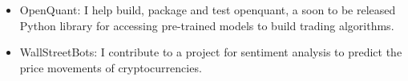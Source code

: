 \documentclass[10pt,a4paper,ragged2e]{altacv}
\begin{document}

\begin{fullwidth}
\makecvheader
\end{fullwidth}



\begin{itemize}
\item OpenQuant: I help build, package and test openquant, a soon to be released Python library for accessing pre-trained models to build trading algorithms.
\item WallStreetBots: I contribute to a project for sentiment analysis to predict the price movements of cryptocurrencies.
\smallskip
\end{itemize}

\divider
\end{document}

